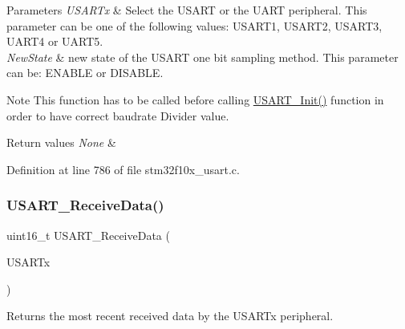 \begin{DoxyParams}{Parameters}
{\em U\+S\+A\+R\+Tx} & Select the U\+S\+A\+RT or the U\+A\+RT peripheral. This parameter can be one of the following values\+: U\+S\+A\+R\+T1, U\+S\+A\+R\+T2, U\+S\+A\+R\+T3, U\+A\+R\+T4 or U\+A\+R\+T5. \\
\hline
{\em New\+State} & new state of the U\+S\+A\+RT one bit sampling method. This parameter can be\+: E\+N\+A\+B\+LE or D\+I\+S\+A\+B\+LE. \\
\hline
\end{DoxyParams}
\begin{DoxyNote}{Note}
This function has to be called before calling \hyperlink{group___u_s_a_r_t___private___functions_ga98da340ea0324002ba1b4263e91ab2ff}{U\+S\+A\+R\+T\+\_\+\+Init()} function in order to have correct baudrate Divider value. 
\end{DoxyNote}

\begin{DoxyRetVals}{Return values}
{\em None} & \\
\hline
\end{DoxyRetVals}


Definition at line 786 of file stm32f10x\+\_\+usart.\+c.

\mbox{\label{group___u_s_a_r_t___private___functions_gac67a91845b0b1d54d31bdfb1c5e9867c}} 
\subsubsection{\texorpdfstring{U\+S\+A\+R\+T\+\_\+\+Receive\+Data()}{USART\_ReceiveData()}}
{\footnotesize\ttfamily uint16\+\_\+t U\+S\+A\+R\+T\+\_\+\+Receive\+Data (\begin{DoxyParamCaption}\item[{\hyperlink{struct_u_s_a_r_t___type_def}{U\+S\+A\+R\+T\+\_\+\+Type\+Def} $\ast$}]{U\+S\+A\+R\+Tx }\end{DoxyParamCaption})}



Returns the most recent received data by the U\+S\+A\+R\+Tx peripheral. 


